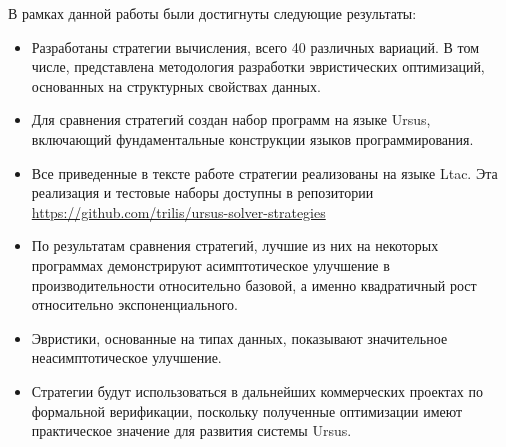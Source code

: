 \documentclass[../thesis.tex]{subfiles}
\begin{document}
В рамках данной работы были достигнуты следующие результаты: 

\begin{itemize}
    \item Разработаны стратегии вычисления, всего 40 различных вариаций. В том числе, представлена методология разработки эвристических оптимизаций, основанных на структурных свойствах данных. 
    \item Для сравнения стратегий создан набор программ на языке Ursus, включающий фундаментальные конструкции языков программирования.
	\item Все приведенные в тексте работе стратегии реализованы на языке Ltac. Эта реализация и тестовые наборы доступны в репозитории \url{https://github.com/trilis/ursus-solver-strategies}
    \item По результатам сравнения стратегий, лучшие из них на некоторых программах демонстрируют асимптотическое улучшение в производительности относительно базовой, а именно квадратичный рост относительно экспоненциального.
    \item Эвристики, основанные на типах данных, показывают значительное неасимптотическое улучшение.
    \item Стратегии будут использоваться в дальнейших коммерческих проектах по формальной верификации, поскольку полученные оптимизации имеют практическое значение для развития системы Ursus.
\end{itemize}
\end{document}
